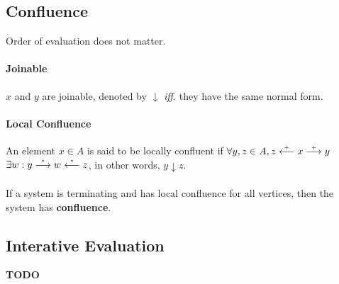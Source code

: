 \subsection{Confluence}

Order of evaluation does not matter.

\paragraph{Joinable} $x$ and $y$ are joinable, denoted by $\downarrow$ \emph{iff.} they have the same normal form.

\paragraph{Local Confluence} An element $x \in A$ is said to be locally confluent if $\forall y, z \in A, z \stackrel{\scriptscriptstyle\!+\!}\longleftarrow x \stackrel{\scriptscriptstyle\!+\!}\longrightarrow y$ $\exists w : y \stackrel{\scriptscriptstyle\!*\!}\longrightarrow w \stackrel{\scriptscriptstyle\!*\!}\longleftarrow z$, in other words, $y \downarrow z$.

\paragraph{\rightarrow} If a system is terminating and has local confluence for all vertices, then the system has \textbf{confluence}.

\subsection{Interative Evaluation}

\textbf{TODO}
